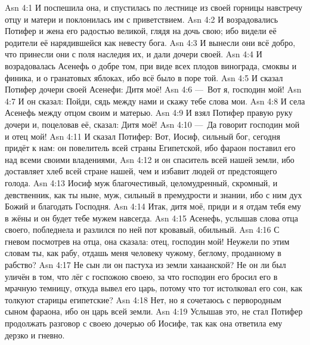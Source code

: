\vs Asn 4:1
И поспешила она, и спустилась
по лестнице из своей горницы навстречу отцу и матери
и поклонилась им с приветствием.
\vs Asn 4:2
И возрадовались Потифер и жена его радостью великой,
глядя на дочь свою; ибо видели её родители
её нарядившейся как невесту бога.
\vs Asn 4:3
И вынесли они всё добро,
что принесли они с поля наследия их, и дали дочери своей.
\vs Asn 4:4
И возрадовалась Асенефь о добре том,
при виде всех плодов винограда, смоквы и финика, и о гранатовых
яблоках, ибо всё было в поре той.
\vs Asn 4:5
И сказал Потифер дочери своей Асенефи: Дитя моё!
\vs Asn 4:6
---~Вот я, господин мой!
\vs Asn 4:7
И он сказал: Пойди, сядь между нами и скажу тебе слова мои.
\vs Asn 4:8
И села Асенефь между отцом своим и матерью.
\vs Asn 4:9
И взял Потифер правую руку дочери и, поцеловав её, сказал: Дитя моё!
\vs Asn 4:10
---~Да говорит господин мой и отец мой!
\vs Asn 4:11
И сказал Потифер:
Вот, Иосиф, сильный бог, сегодня придёт к нам: он повелитель всей страны
Египетской, ибо фараон поставил его над всеми своими владениями,
\vs Asn 4:12
и он спаситель всей нашей земли,
ибо доставляет хлеб всей стране нашей,
чем и избавит людей от предстоящего голода.
\vs Asn 4:13
Иосиф муж благочестивый, целомудренный,
скромный, и девственник, как ты ныне, муж, сильный в премудрости
и знании, ибо с ним дух Божий и благодать Господня.
\vs Asn 4:14
Итак, дитя моё,
приди и я отдам тебя ему в жёны и он будет тебе мужем навсегда.
\vs Asn 4:15
Асенефь, услышав слова отца
своего, побледнела и разлился по ней пот кровавый, обильный.
\vs Asn 4:16
С гневом посмотрев на отца, она сказала:
отец, господин мой!
Неужели по этим словам ты, как рабу,
отдашь меня человеку чужому, беглому, проданному в рабство?
\vs Asn 4:17
Не сын ли он пастуха из земли ханаанской?
Не он ли был уличён в том, что лёг с госпожою своею,
за что господин его бросил его в мрачную темницу,
откуда вывел его царь,
потому что тот истолковал его сон,
как толкуют старицы египетские?
\vs Asn 4:18
Нет, но я сочетаюсь с первородным сыном фараона,
ибо он царь всей земли.
\vs Asn 4:19
Услышав это, не стал
Потифер продолжать разговор с своею дочерью об Иосифе,
так как она ответила ему дерзко и гневно.

